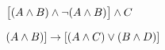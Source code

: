 \begin{earg}
\item $\bigl[(A\wedge B) \wedge\neg(A\wedge B)\bigr] \wedge C$ \vspace{.5ex}	
%
%
%
%
%
\item $(A \wedge B) ]\rightarrow[(A \wedge C) \vee (B \wedge D)]$ \vspace{.5ex}		
%
%
%
\end{earg}

